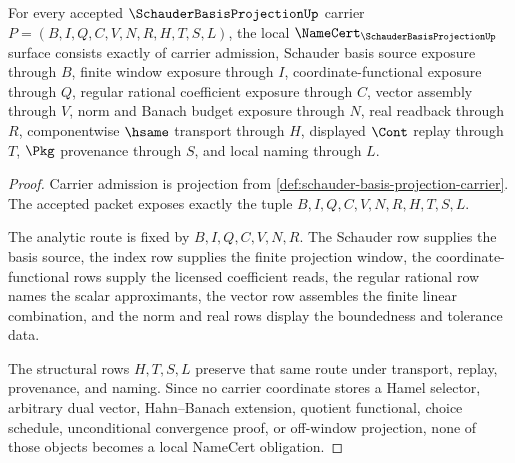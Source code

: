 \begin{theorem}
\label{thm:schauder-basis-projection-namecert-obligations}
For every accepted $\SchauderBasisProjectionUp$ carrier $P=(B,I,Q,C,V,N,R,H,T,S,L)$, the local $\NameCert_{\SchauderBasisProjectionUp}$ surface consists exactly of carrier admission, Schauder basis source exposure through $B$, finite window exposure through $I$, coordinate-functional exposure through $Q$, regular rational coefficient exposure through $C$, vector assembly through $V$, norm and Banach budget exposure through $N$, real readback through $R$, componentwise $\hsame$ transport through $H$, displayed $\Cont$ replay through $T$, $\Pkg$ provenance through $S$, and local naming through $L$.
\end{theorem}
\begin{proof}
Carrier admission is projection from \autoref{def:schauder-basis-projection-carrier}. The accepted packet exposes exactly the tuple $B,I,Q,C,V,N,R,H,T,S,L$.

The analytic route is fixed by $B,I,Q,C,V,N,R$. The Schauder row supplies the basis source, the index row supplies the finite projection window, the coordinate-functional rows supply the licensed coefficient reads, the regular rational row names the scalar approximants, the vector row assembles the finite linear combination, and the norm and real rows display the boundedness and tolerance data.

The structural rows $H,T,S,L$ preserve that same route under transport, replay, provenance, and naming. Since no carrier coordinate stores a Hamel selector, arbitrary dual vector, Hahn--Banach extension, quotient functional, choice schedule, unconditional convergence proof, or off-window projection, none of those objects becomes a local NameCert obligation.
\end{proof}

